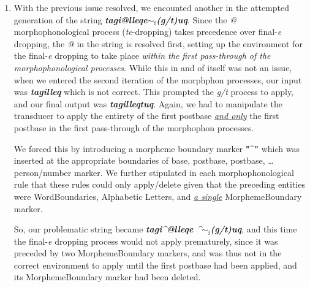 \documentclass{article}
\begin{document}
\begin{enumerate}
\item With the previous issue resolved, we encounted another in the attempted generation of the string \textit{\textbf{tagi@lleqe${\sim}_\text{f}$(g/t)uq}}. Since the \textit{@} morphophonological process (\textit{te}-dropping) takes precedence over final-\textit{e} dropping, the \textit{@} in the string is resolved first, setting up the environment for the final-\textit{e} dropping to take place \textit{within the first pass-through of the morphophonological processes}. While this in and of itself was not an issue, when we entered the second iteration of the morphphon processes, our input was \textit{\textbf{tagilleq}} which is not correct. This prompted the \textit{g/t} process to apply, and our final output was \textit{\textbf{tagilleqtuq}}. Again, we had to manipulate the transducer to apply the entirety of the first postbase \textit{\uline{and only}} the first postbase in the first pass-through of the morphophon processes.

We forced this by introducing a morpheme boundary marker \textbf{"\textasciicircum"} which was inserted at the appropriate boundaries of base, postbase, postbase, \ldots person/number marker. We further stipulated in each morphophonological rule that these rules could only apply/delete given that the preceding entities were WordBoundaries, Alphabetic Letters, and \textit{\uline{a single}} MorphemeBoundary marker.

So, our problematic string became \textit{\textbf{tagi\textasciicircum @lleqe \textasciicircum ${\sim}_\text{f}$(g/t)uq}}, and this time the final-\textit{e} dropping process would not apply prematurely, since it was preceded by two MorphemeBoundary markers, and was thus not in the correct environment to apply until the first postbase had been applied, and its MorphemeBoundary marker had been deleted.


\end{enumerate}
\end{document}
